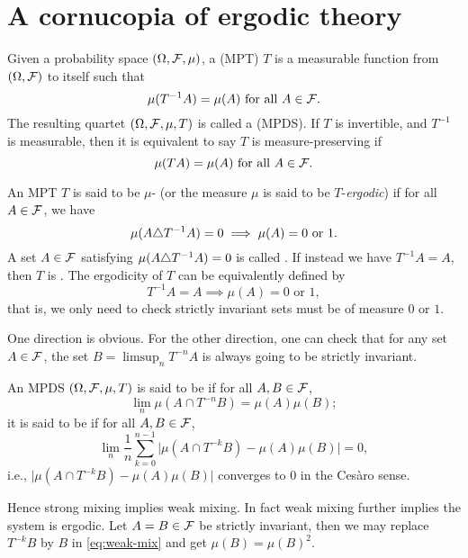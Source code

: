 \chapter{A cornucopia of ergodic theory}
Given a probability space $(\Omega,\mathcal{F},\mu)$, a  (MPT) $T$ is a measurable function from $(\Omega,\mathcal{F})$ to itself such that \[
    \mu(T^{-1}A) = \mu(A)\text{ for all }A\in \mathcal{F}.
\] The resulting quartet $(\Omega,\mathcal{F},\mu,T)$ is called a  (MPDS). If $T$ is invertible, and $T^{-1}$ is measurable, then it is equivalent to say $T$ is measure-preserving if \[
    \mu(TA) = \mu(A) \text{ for all }A\in \mathcal{F}.
\]

An MPT $T$ is said to be $\mu$- (or the measure $\mu$ is said to be $T$-\emph{ergodic}) if for all $A\in \mathcal{F}$, we have \[
    \mu(A \triangle T^{-1} A) = 0 \implies \mu(A) = 0 \text{ or } 1.
\] A set $A\in \mathcal{F}$ satisfying $\mu(A \triangle T^{-1} A) = 0$ is called . If instead we have $T^{-1}A = A$, then $T$ is . The ergodicity of $T$ can be equivalently defined by \[
    T^{-1} A = A \implies \mu(A) = 0 \text{ or } 1,
\] that is, we only need to check strictly invariant sets must be of measure $0$ or $1$.

One direction is obvious. For the other direction, one can check that for any set $A\in \mathcal{F}$, the set $B = \limsup_n T^{-n} A$ is always going to be strictly invariant.

\begin{defn}
    An MPDS $(\Omega,\mathcal{F},\mu,T)$ is said to be  if for all $A,B\in \mathcal{F}$, \begin{equation}
        \lim_n \mu(A\cap T^{-n} B) = \mu(A) \mu(B); \label{eq:strong-mix}
    \end{equation}
    it is said to be  if for all $A,B\in \mathcal{F}$,\begin{equation} \label{eq:weak-mix}
        \lim_n \frac{1}{n} \sum_{k=0}^{n-1} \bigl\lvert \mu(A \cap T^{-k} B) - \mu(A) \mu(B) \bigr\rvert = 0,
    \end{equation} i.e., $\bigl\lvert \mu(A \cap T^{-k} B) - \mu(A) \mu(B) \bigr\rvert$ converges to $0$ in the Cesàro sense.
\end{defn}

Hence strong mixing implies weak mixing. In fact weak mixing further implies the system is ergodic. Let $A = B\in \mathcal{F}$ be strictly invariant, then we may replace $T^{-k} B$ by $B$ in \eqref{eq:weak-mix} and get $\mu(B) = \mu(B)^2.$

